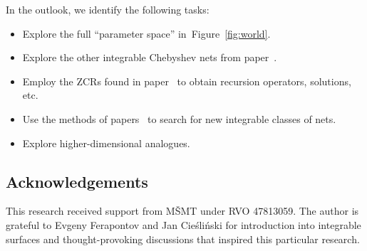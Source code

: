 \documentclass[pdftex]{sigma}
\numberwithin{equation}{section}
\begin{document}
In the outlook, we identify the following tasks:
\begin{itemize}\itemsep=0pt
\item[--] Explore the full ``parameter space'' in~Figure~\ref{fig:world}.
\item[--] Explore the other integrable Chebyshev nets from paper~\cite{K-M}.
\item[--] Employ the ZCRs found in paper~\cite{K-M} to obtain recursion operators,
solutions, etc.
\item[--] Use the methods of papers~\cite{B-M-2010,K-M} to search for new integrable
classes of nets.
\item[--] Explore higher-dimensional analogues.
\end{itemize}


\subsection*{Acknowledgements}

This research received support from M\v{S}MT under RVO 47813059.
The author is grateful to Evgeny Ferapontov and Jan Cie\'sli\'nski for introduction
into integrable surfaces and thought-provoking discussions that inspired this
particular research.

%
%
\end{document}
